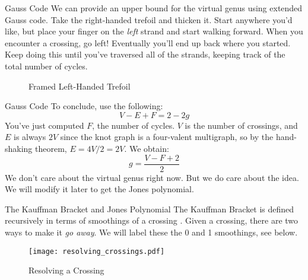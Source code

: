 \documentclass{beamer}
\begin{document}
    \begin{frame}{Gauss Code}
        We can provide an upper bound for the virtual genus using
        extended Gauss code. Take the right-handed trefoil and thicken it.
        Start anywhere you'd like, but
        place your finger on the \textit{left} strand and start walking forward.
        When you encounter a crossing, go left! Eventually you'll end up back
        where you started. Keep doing this until you've traversed all of the
        strands, keeping track of the total number of cycles.
        \begin{figure}
            \centering
            \caption{Framed Left-Handed Trefoil}
            \label{fig:trefoil_knot_framed_001}
        \end{figure}
    \end{frame}
    \begin{frame}{Gauss Code}
        To conclude, use the following:
        \begin{equation}
            V-E+F=2-2g
        \end{equation}
        You've just computed $F$, the number of cycles.
        $V$ is the number of crossings, and
        $E$ is always $2V$ since the knot graph is a four-valent multigraph,
        so by the hand-shaking theorem, $E=4V/2=2V$. We obtain:
        \begin{equation}
            g=\frac{V-F+2}{2}
        \end{equation}
        We don't care about the virtual genus right now. But we do care about
        the idea. We will modify it later to get the Jones polynomial.
    \end{frame}
    \begin{frame}{The Kauffman Bracket and Jones Polynomial}
        The Kauffman Bracket is defined recursively in terms of smoothings of a
        crossing \cite[p.~396]{KauffmanStateModels}.
        Given a crossing, there are two ways to make it
        \textit{go away}. We will label these the 0 and 1 smoothings, see below.
        \begin{figure}
            \centering
            \texttt{[image: resolving\_crossings.pdf]}
            \caption{Resolving a Crossing}
            \label{fig:resolving_crossing}
        \end{figure}
    \end{frame}
\end{document}
